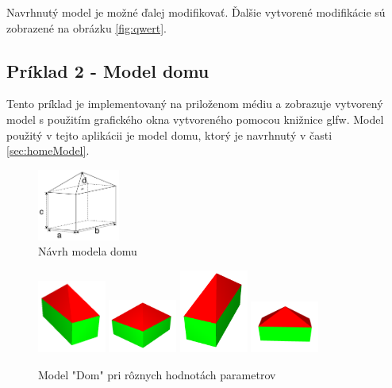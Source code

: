 Navrhnutý model je možné ďalej modifikovať. Ďalšie vytvorené modifikácie sú zobrazené na obrázku \ref{fig:qwert}.



\newpage
\subsection*{Príklad 2 - Model domu}\label{priklad2}
Tento príklad je implementovaný na priloženom médiu a zobrazuje vytvorený model s použitím grafického okna vytvoreného pomocou knižnice glfw. Model použitý v tejto aplikácii je model domu, ktorý je navrhnutý v časti \ref{sec:homeModel}.


\begin{figure}[H]
	\centering
	\includegraphics[width=0.24\textwidth]{obrazky-figures/Examples/B4.pdf}
	\caption{Návrh modela domu}
	\label{fig:homeModelnavrh}
\end{figure}

\begin{figure}[H]
	\centering
	\includegraphics[width=0.20\textwidth]{obrazky-figures/Examples/home.png}
	\includegraphics[width=0.20\textwidth]{obrazky-figures/Examples/home1.png}
	\includegraphics[width=0.20\textwidth]{obrazky-figures/Examples/home2.png}
	\includegraphics[width=0.20\textwidth]{obrazky-figures/Examples/home3.png}
	\caption{Model "Dom" pri rôznych hodnotách parametrov}
	\label{fig:homeModel}
\end{figure}

